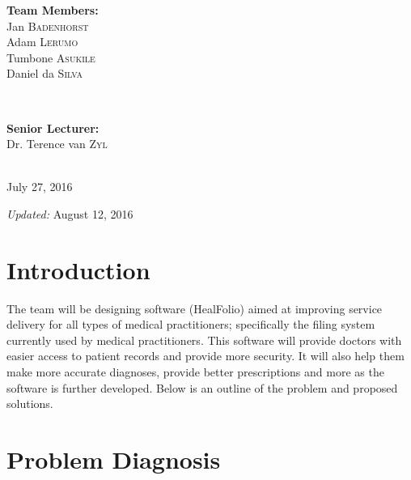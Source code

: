 \documentclass[a4paper]{article}
\begin{document}
\begin{titlepage}
\begin{minipage}{0.4\textwidth}
\begin{flushleft}
\textbf{Team Members:} \\[0.3cm]

Jan \textsc{Badenhorst} \\
Adam \textsc{Lerumo} \\
Tumbone \textsc{Asukile} \\
Daniel da \textsc{Silva} \\

\end{flushleft}

\end{minipage} \\[0.7cm]

\begin{minipage}{0.4\textwidth}

\begin{flushright} \large

\textbf{Senior Lecturer:} \\[0.3cm]

Dr. Terence van \textsc{Zyl} \\

\end{flushright}

\end{minipage} \\[2cm]

{\large July 27, 2016}

{\emph{Updated:} August 12, 2016}
    
\end{titlepage}

\setlength\parindent{24pt}

\section*{Introduction}

The team will be designing software (HealFolio) aimed at improving service delivery for all types of medical practitioners; specifically the filing system currently used by medical practitioners. This software will provide doctors with easier access to patient records and provide more security. It will also help them make more accurate diagnoses, provide better prescriptions and more as the software is further developed. Below is an outline of the problem and proposed solutions.

\section*{Problem Diagnosis}
\end{document}
